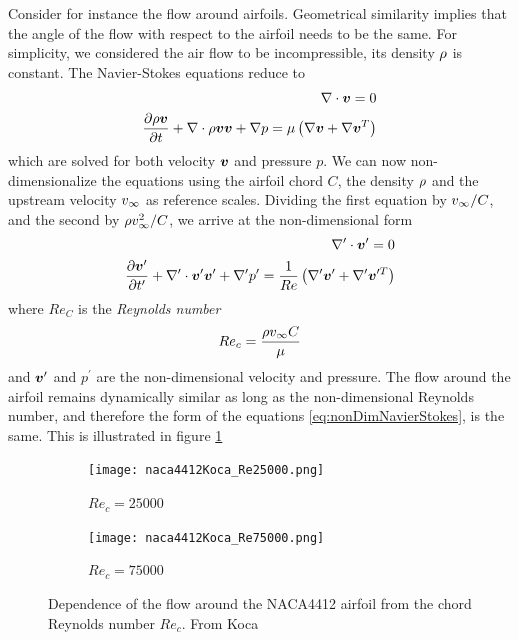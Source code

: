Consider for instance the flow around airfoils. Geometrical similarity
implies that the angle of the flow with respect to the airfoil needs
to be the same. For simplicity, we considered the air flow to be
incompressible, \ie its density $\rho$ is constant. The Navier-Stokes
equations reduce to
\begin{align*}
  \nabla \cdot \boldsymbol {v} = 0 \\
  \frac{\partial \rho \boldsymbol {v}}{\partial t} + \nabla \cdot \rho \boldsymbol {v} \boldsymbol {v} + \nabla p = \mu
  \left(\nabla \boldsymbol {v} + \nabla \boldsymbol {v}^T\right)
\end{align*}
which are solved for both velocity $\boldsymbol {v}$ and pressure $p$. We can
now non-dimensionalize the equations using the airfoil chord $C$, the
density $\rho$ and the upstream velocity $v_\infty$ as reference
scales. Dividing the first equation by $v_\infty / C$, and the
second by $\rho v_\infty^2/C$, we arrive at the non-dimensional
form
\begin{equation}
  \begin{split}
  \nabla^\prime \cdot \boldsymbol {v}^\prime = 0 \\
  \frac{\partial \boldsymbol {v}^\prime}{\partial t^\prime} + \nabla^\prime \cdot \boldsymbol {v}^\prime \boldsymbol {v}^\prime + \nabla^\prime p^\prime = \frac{1}{Re} 
  \left(\nabla^\prime \boldsymbol {v}^\prime + \nabla^\prime \boldsymbol {v}^{\prime T}\right)
  \end{split}
  \label{eq:nonDimNavierStokes}
\end{equation}
where $Re_C$ is the \emph{Reynolds number}
\begin{align*}
  Re_c = \frac{\rho v_\infty C}{\mu}
\end{align*}
and $\boldsymbol {v}^\prime$ and $p^\prime$ are the non-dimensional velocity and
pressure. The flow around the airfoil remains dynamically similar as
long as the non-dimensional Reynolds number, and therefore the form of
the equations \ref{eq:nonDimNavierStokes}, is the same. This is
illustrated in figure \ref{fig:naca4412_flow}
\begin{figure}[!h]
  \centering
  \begin{subfigure}{0.49\textwidth}
    \texttt{[image: naca4412Koca\_Re25000.png]}
    \caption{$Re_c = 25000$}
  \end{subfigure}
  \begin{subfigure}{0.49\textwidth}
    \texttt{[image: naca4412Koca\_Re75000.png]}
    \caption{$Re_c = 75000$}
  \end{subfigure}
  \caption{Dependence of the flow around the NACA4412 airfoil from the
    chord Reynolds number $Re_c$. From Koca \etal \cite{KGA+18}}
  \label{fig:naca4412_flow}
\end{figure}
